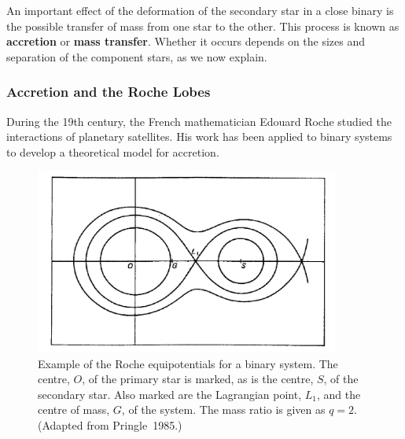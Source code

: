 An important effect of the deformation of the secondary star in a close binary is the possible transfer of mass from one star to the other. This process is known as \textbf{accretion} or \textbf{mass transfer}. Whether it occurs depends on the sizes and separation of the component stars, as we now explain.%


\subsubsection{Accretion and the Roche Lobes}
\label{cha:Introduction:sec:BinaryStarSystems:subsec:Accretion:subsubsec:RocheLobes}

During the 19th century, the French mathematician Edouard Roche
studied the interactions of planetary satellites. %
His work has been applied to binary systems to develop a theoretical
model for accretion.

\begin{figure}[!htb]
\begin{center}
\includegraphics[width=10.0cm]{PringleRoche}
\caption{%
Example of the Roche equipotentials for a binary system.  The centre,
$O$, of the primary star is marked, as is
the centre, $S$, of the secondary star.  Also marked are
the Lagrangian point, $L_1$, and the centre of mass, $G$, of the
system. The mass ratio is given as $q = 2$. %
(Adapted from Pringle~1985.)%
}
\label{cha:Introduction:sec:BinaryStarSystems:subsec:Accretion:subsubsec:RocheLobes:fig:PringleRoche}
\end{center}
\end{figure}
\nocite{Pringle:1985} %

\vspace{\myparskip}

